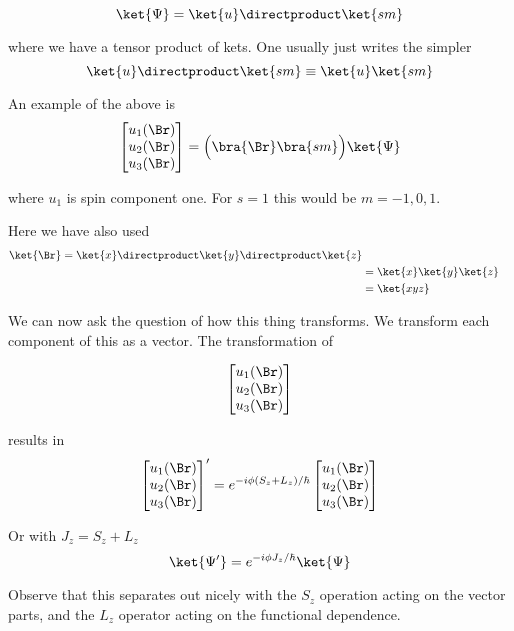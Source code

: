 \begin{equation}\label{eqn:PHY356FDec7:190}
\ket{\Psi} = \ket{u} \directproduct \ket{s m}
\end{equation}

where we have a tensor product of kets.  One usually just writes the simpler
\begin{equation}\label{eqn:PHY356FDec7:195}
\ket{u} \directproduct \ket{s m} \equiv \ket{u} \ket{s m}
\end{equation}

An example of the above is
\begin{equation}\label{eqn:PHY356FDec7:200}
\begin{bmatrix}
u_1(\Br) \\
u_2(\Br) \\
u_3(\Br) \\
\end{bmatrix}
= \Bigl( \bra{\Br} \bra{ s m} \Bigr) \ket{\Psi}
\end{equation}

where $u_1$ is spin component one.  For $s=1$ this would be $m=-1, 0, 1$.

Here we have also used
\begin{align*}
\ket{\Br}
=
\ket{x}
\directproduct
\ket{y}
\directproduct
\ket{z} \\
&=
\ket{x}
\ket{y}
\ket{z} \\
&=
\ket{x y z}
\end{align*}

We can now ask the question of how this thing transforms.  We transform each component of this as a vector.  The transformation of

\begin{align*}
\begin{bmatrix}
u_1(\Br) \\
u_2(\Br) \\
u_3(\Br)
\end{bmatrix}
\end{align*}

results in
\begin{equation}\label{eqn:PHY356FDec7:210}
{\begin{bmatrix}
u_1(\Br) \\
u_2(\Br) \\
u_3(\Br)
\end{bmatrix}}'
=
e^{ -i \phi (S_z + L_z)/\hbar }
\begin{bmatrix}
u_1(\Br) \\
u_2(\Br) \\
u_3(\Br)
\end{bmatrix}
\end{equation}

Or with $J_z = S_z + L_z$
\begin{equation}\label{eqn:PHY356FDec7:220}
\ket{\Psi'} = e^{-i \phi J_z/\hbar } \ket{\Psi}
\end{equation}

Observe that this separates out nicely with the $S_z$ operation acting on the vector parts, and the $L_z$ operator acting on the functional dependence.
